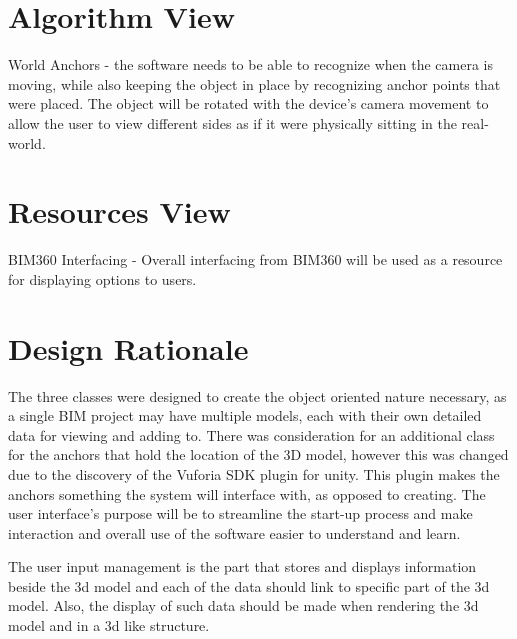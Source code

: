 \documentclass[onecolumn, draftclsnofoot,10pt, compsoc]{IEEEtran}
\begin{document}
\section{Algorithm View}
World Anchors - the software needs to be able to recognize when the camera is moving, while also keeping the object in place by recognizing anchor points that were placed. The object will be rotated with the device's camera movement to allow the user to view different sides as if it were physically sitting in the real-world.

\section{Resources View}
BIM360 Interfacing - Overall interfacing from BIM360 will be used as a resource for displaying options to users.

\section{Design Rationale}
The three classes were designed to create the object oriented nature necessary, as a single BIM project may have multiple models, each with their own detailed data for viewing and adding to. There was consideration for an additional class for the anchors that hold the location of the 3D model, however this was changed due to the discovery of the Vuforia SDK plugin for unity. This plugin makes the anchors something the system will interface with, as opposed to creating. The user interface's purpose will be to streamline the start-up process and make interaction and overall use of the software easier to understand and learn. 

The user input management is the part that stores and displays information beside the 3d model and each of the data should link to specific part of the 3d model. Also, the display of such data should be made when rendering the 3d model and in a 3d like structure.
\end{document}

